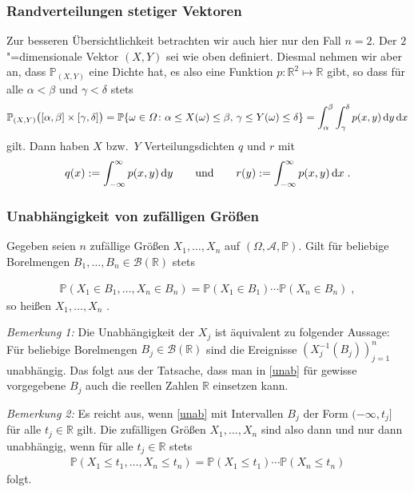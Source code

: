\documentclass[ngerman,draft,parskip=half,twoside]{scrartcl}
\newcommand*{\highl}[2][]{\textbf{\boldmath{#2}}%
  \ifthenelse{\equal{#1}{}}{\index{#2}}{\index{#1}}%
}
\newcommand*{\R}{\mathbb{R}}      %
\newcommand*{\Algeb}{\mathcal{A}}   %
\newcommand*{\BorelM}{\mathcal{B}}  %
\newcommand*{\WKM}{\mathbb{P}}      %
\newcommand*{\diff}[1]{%
  \mathop{\mathrm{\mathstrut d}}%
  \ifx#1(\else%
  \ifx#1[\else%
  \ifx#1\{\else%
    \!%
  \fi\fi\fi#1%
}
\begin{document}
\subsubsection{Randverteilungen stetiger Vektoren}
\label{stet}

Zur besseren Übersichtlichkeit betrachten wir auch hier nur den Fall $n=2$. Der
$2$"=dimensionale Vektor $(X,Y)$ sei wie oben definiert. Diesmal nehmen wir
aber an, dass $\WKM_{(X,Y)}$ eine Dichte hat, es also eine Funktion $p
\colon\R^2\mapsto\R$ gibt, so dass für alle $\alpha<\beta$ und $\gamma<\delta$
stets
\begin{gather*}
  \WKM_{(X,Y)}\big([\alpha,\beta]\times[\gamma,\delta]\big)
     =\WKM\{\omega\in \Omega \colon
       \alpha\le X(\omega)\le\beta,\,\gamma\le Y(\omega)\le\delta\}
     =\int_\alpha^\beta\int_\gamma^\delta p(x,y)\diff{y} \diff{x}
\end{gather*}
gilt. Dann haben $X$ bzw.~$Y$ Verteilungsdichten $q$ und $r$ mit
\begin{gather*}
  q(x):=\int_{-\infty}^\infty p(x,y)\diff{y}\qquad\mbox{und}\qquad
     r(y):=\int_{-\infty}^\infty p(x,y)\diff{x}\;.
\end{gather*}

\subsubsection{Unabhängigkeit von zufälligen Größen}

Gegeben seien $n$ zufällige Größen $X_1,\dotsc,X_n$ auf $(\Omega,\Algeb,\WKM)$.
Gilt für beliebige Borelmengen $B_1,\dotsc,B_n\in\BorelM(\R)$ stets

\begin{gather}
  \label{unab}
  \WKM(X_1\in B_1,\dotsc,X_n\in B_n)=\WKM(X_1\in B_1)\dotsm\WKM(X_n\in B_n)\;,
\end{gather}
so heißen $X_1,\dotsc,X_n$ \highl{unabhängig}.

\textit{Bemerkung 1:}
Die Unabhängigkeit der $X_j$ ist äquivalent zu folgender Aussage: Für beliebige
Borelmengen $B_j\in\BorelM(\R)$ sind die Ereignisse
$\left(X_j^{-1}(B_j)\right)_{j=1}^n$ unabhängig. Das folgt aus der Tatsache,
dass man in \autoref{unab} für gewisse vorgegebene $B_j$ auch die reellen
Zahlen $\R$ einsetzen kann.

\textit{Bemerkung 2:}
Es reicht aus, wenn \autoref{unab} mit Intervallen $B_j$ der Form
$(-\infty,t_j]$ für alle $t_j\in\R$ gilt. Die zufälligen Größen
$X_1,\dotsc,X_n$ sind also dann und nur dann unabhängig, wenn für alle
$t_j\in\R$ stets
\begin{gather*}
  \WKM(X_1\le t_1,\dotsc,X_n\le t_n)=\WKM(X_1\le t_1)\dotsm\WKM(X_n\le t_n)
\end{gather*}
folgt.
\end{document}
